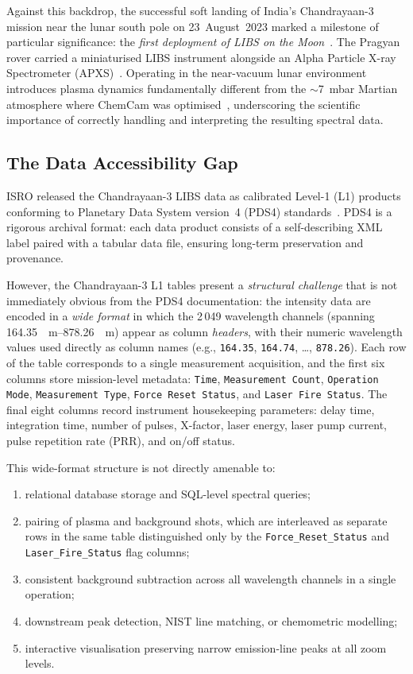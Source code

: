 \documentclass[a4paper,twocolumn,10pt]{article}
\begin{document}
Against this backdrop, the successful soft landing of India's
Chandrayaan-3 mission near the lunar south pole on 23~August~2023
marked a milestone of particular significance: the \emph{first
deployment of LIBS on the Moon}~\cite{ISROCh3}.  The Pragyan rover
carried a miniaturised LIBS instrument alongside an Alpha Particle
X-ray Spectrometer (APXS)~\cite{Laxmiprasad2020}.  Operating in the
near-vacuum lunar environment introduces plasma dynamics fundamentally
different from the $\sim$7~mbar Martian atmosphere where ChemCam was
optimised~\cite{Saeidfirozeh2024}, underscoring the scientific
importance of correctly handling and interpreting the resulting spectral
data.

\subsection{The Data Accessibility Gap}

ISRO released the Chandrayaan-3 LIBS data as calibrated Level-1 (L1)
products conforming to Planetary Data System version~4 (PDS4)
standards~\cite{Hughes2018}.  PDS4 is a rigorous archival format: each
data product consists of a self-describing XML label paired with a
tabular data file, ensuring long-term preservation and provenance.

However, the Chandrayaan-3 L1 tables present a \emph{structural
challenge} that is not immediately obvious from the PDS4 documentation:
the intensity data are encoded in a \emph{wide format} in which the
2\,049 wavelength channels (spanning \SIrange{164.35}{878.26}{\nano
\metre}) appear as column \emph{headers}, with their numeric wavelength
values used directly as column names (e.g., \texttt{164.35},
\texttt{164.74}, \ldots, \texttt{878.26}).  Each row of the table
corresponds to a single measurement acquisition, and the first six
columns store mission-level metadata: \texttt{Time},
\texttt{Measurement Count}, \texttt{Operation Mode},
\texttt{Measurement Type}, \texttt{Force Reset Status}, and
\texttt{Laser Fire Status}.  The final eight columns record instrument
housekeeping parameters: delay time, integration time, number of
pulses, X-factor, laser energy, laser pump current, pulse repetition
rate (PRR), and on/off status.

This wide-format structure is not directly amenable to:
\begin{enumerate}[nosep,leftmargin=*]
  \item relational database storage and SQL-level spectral queries;
  \item pairing of plasma and background shots, which are interleaved
    as separate rows in the same table distinguished only by the
    \texttt{Force\_Reset\_Status} and \texttt{Laser\_Fire\_Status}
    flag columns;
  \item consistent background subtraction across all wavelength
    channels in a single operation;
  \item downstream peak detection, NIST line matching, or
    chemometric modelling;
  \item interactive visualisation preserving narrow emission-line
    peaks at all zoom levels.
\end{enumerate}
\end{document}
